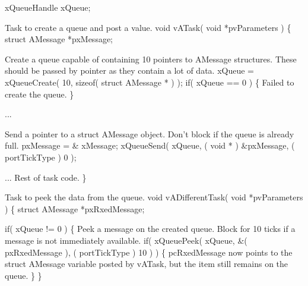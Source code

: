 \begin{DoxyPre} xQueueHandle xQueue;\end{DoxyPre}



\begin{DoxyPre}Task to create a queue and post a value.
 void vATask( void *pvParameters )
 \{
 struct AMessage *pxMessage;\end{DoxyPre}



\begin{DoxyPre}Create a queue capable of containing 10 pointers to AMessage structures.
These should be passed by pointer as they contain a lot of data.
    xQueue = xQueueCreate( 10, sizeof( struct AMessage * ) );
    if( xQueue == 0 )
    \{
Failed to create the queue.
    \}\end{DoxyPre}



\begin{DoxyPre}...\end{DoxyPre}



\begin{DoxyPre}Send a pointer to a struct AMessage object.  Don't block if the
queue is already full.
    pxMessage = \& xMessage;
    xQueueSend( xQueue, ( void * ) \&pxMessage, ( portTickType ) 0 );\end{DoxyPre}



\begin{DoxyPre}... Rest of task code.
 \}\end{DoxyPre}



\begin{DoxyPre}Task to peek the data from the queue.
 void vADifferentTask( void *pvParameters )
 \{
 struct AMessage *pxRxedMessage;\end{DoxyPre}



\begin{DoxyPre}    if( xQueue != 0 )
    \{
Peek a message on the created queue.  Block for 10 ticks if a
message is not immediately available.
        if( xQueuePeek( xQueue, \&( pxRxedMessage ), ( portTickType ) 10 ) )
        \{
pcRxedMessage now points to the struct AMessage variable posted
by vATask, but the item still remains on the queue.
        \}
    \}\end{DoxyPre}




